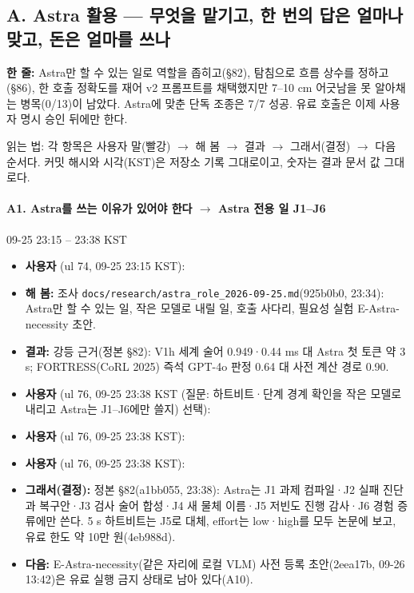 \subsection{A. Astra 활용 --- 무엇을 맡기고, 한 번의 답은 얼마나 맞고, 돈은 얼마를 쓰나}\label{rec:A}
\noindent\textbf{한 줄:} Astra만 할 수 있는 일로 역할을 좁히고(§82), 탐침으로 흐름 상수를 정하고(§86), 한 호출 정확도를 재어 v2 프롬프트를 채택했지만 7--10 cm 어긋남을 못 알아채는 병목(0/13)이 남았다. Astra에 맞춘 단독 조종은 7/7 성공. 유료 호출은 이제 사용자 명시 승인 뒤에만 한다.

읽는 법: 각 항목은 사용자 말(빨강) $\rightarrow$ 해 봄 $\rightarrow$ 결과 $\rightarrow$ 그래서(결정) $\rightarrow$ 다음 순서다. 커밋 해시와 시각(KST)은 저장소 기록 그대로이고, 숫자는 결과 문서 값 그대로다.

\paragraph{A1. Astra를 쓰는 이유가 있어야 한다 $\rightarrow$ Astra 전용 일 J1--J6}
{\small 09-25 23:15 -- 23:38 KST}
\begin{itemize}
  \item \textbf{사용자} (ul 74, 09-25 23:15 KST): 
  \item \textbf{해 봄:} 조사 \texttt{docs/\allowbreak{}research/\allowbreak{}astra\_\allowbreak{}role\_\allowbreak{}2026-\allowbreak{}09-\allowbreak{}25.\allowbreak{}md}(925b0b0, 23:34): Astra만 할 수 있는 일, 작은 모델로 내릴 일, 호출 사다리, 필요성 실험 E-Astra-necessity 초안.
  \item \textbf{결과:} 강등 근거(정본 §82): V1h 세계 술어 0.949·0.44 ms 대 Astra 첫 토큰 약 3 s; FORTRESS(CoRL 2025) 즉석 GPT-4o 판정 0.64 대 사전 계산 경로 0.90.
  \item \textbf{사용자} (ul 76, 09-25 23:38 KST (질문: 하트비트·단계 경계 확인을 작은 모델로 내리고 Astra는 J1--J6에만 쓸지) 선택): 
  \item \textbf{사용자} (ul 76, 09-25 23:38 KST): 
  \item \textbf{사용자} (ul 76, 09-25 23:38 KST): 
  \item \textbf{그래서(결정):} 정본 §82(a1bb055, 23:38): Astra는 J1 과제 컴파일·J2 실패 진단과 복구안·J3 검사 술어 합성·J4 새 물체 이름·J5 저빈도 진행 감사·J6 경험 증류에만 쓴다. 5 s 하트비트는 J5로 대체, effort는 low·high를 모두 논문에 보고, 유료 한도 약 10만 원(4eb988d).
  \item \textbf{다음:} E-Astra-necessity(같은 자리에 로컬 VLM) 사전 등록 초안(2eea17b, 09-26 13:42)은 유료 실행 금지 상태로 남아 있다(A10).
\end{itemize}

